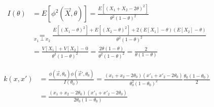 \documentclass[11pt]{article}
\begin{document}
\begin{enumerate}
\begin{align*}
I(\theta)&=E[\phi^2(\vec X,\theta)]=\frac{E[(X_1+X_2-2\theta)^2]}{\theta^2(1-\theta)^2}\\
&\underset{x_1\perp x_2}{=}\frac{E[(X_1-\theta)^2]+E[(X_2-\theta)^2]+2(E[X_1]-\theta)(E[X_2]-\theta)}{\theta^2(1-\theta)^2}\\
&=\frac{V[X_1]+V[X_2]-0}{\theta^2(1-\theta)^2}=\frac{2\theta(1-\theta)}{\theta^2(1-\theta)^2}=\frac{2}{\theta(1-\theta)}
\end{align*}

\begin{align*}
k(x,x')&=\frac{\phi(\vec x,\theta_0)\phi(\vec x',\theta_0)}{I(\theta_0)}=\frac{(x_1+x_2-2\theta_0)(x'_1+x'_2-2\theta_0)}{\theta_0^2(1-\theta_0)^2}\frac{\theta_0(1-\theta_0)}2\\
&=\frac{(x_1+x_2-2\theta_0)(x'_1+x'_2-2\theta_0)}{2\theta_0(1-\theta_0)}
\end{align*}

\end{enumerate}
 


 
\end{document}
